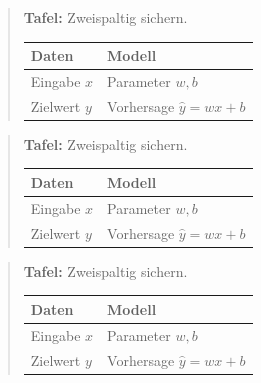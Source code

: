 \begin{quote}
\textbf{Tafel:} Zweispaltig sichern.

\par\addvspace{\medskipamount}
\noindent\begin{tabularx}{\linewidth}{@{}>{\raggedright\arraybackslash}p{}>{\raggedright\arraybackslash}X@{}}
\toprule
Daten & Modell \\
\midrule
Eingabe $x$ & Parameter $w,b$ \\
Zielwert $y$ & Vorhersage $\hat y=wx+b$ \\
\bottomrule
\end{tabularx}
\par\addvspace{\medskipamount}
\end{quote}
\begin{quote}
\textbf{Tafel:} Zweispaltig sichern.

\par\addvspace{\medskipamount}
\noindent\begin{tabularx}{\linewidth}{@{}>{\raggedright\arraybackslash}p{}>{\raggedright\arraybackslash}X@{}}
\toprule
Daten & Modell \\
\midrule
Eingabe $x$ & Parameter $w,b$ \\
Zielwert $y$ & Vorhersage $\hat y=wx+b$ \\
\bottomrule
\end{tabularx}
\par\addvspace{\medskipamount}
\end{quote}
\begin{quote}
\textbf{Tafel:} Zweispaltig sichern.

\par\addvspace{\medskipamount}
\noindent\begin{tabularx}{\linewidth}{@{}>{\raggedright\arraybackslash}p{}>{\raggedright\arraybackslash}X@{}}
\toprule
Daten & Modell \\
\midrule
Eingabe $x$ & Parameter $w,b$ \\
Zielwert $y$ & Vorhersage $\hat y=wx+b$ \\
\bottomrule
\end{tabularx}
\par\addvspace{\medskipamount}
\end{quote}
